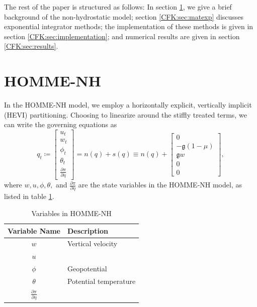 \documentclass{csri19}
\newcommand{\CFKg}{\mathfrak{g}}
\begin{document}
The rest of the paper is structured as follows: In section 
\ref{CFK:sec:homme}, we give a brief background of the non-hydrostatic 
model; section \ref{CFK:sec:matexp} discusses exponential integrator 
methods; the implementation of these methods is given in section 
\ref{CFK:sec:implementation}; and numerical results are given in section 
\ref{CFK:sec:results}.

\section{HOMME-NH}\label{CFK:sec:homme}
In the HOMME-NH model, we employ a horizontally explicit, vertically 
implicit (HEVI) partitioning. Choosing to linearize around the stiffly 
treated terms, we can write the governing equations as
\[q_t \coloneqq \begin{bmatrix} u_t \\
w_t\\
\phi_t\\
\theta_t\\
\frac{\partial \pi}{\partial \eta}
\end{bmatrix} = n(q) + s(q) \equiv n(q) + \begin{bmatrix}
0\\
-\CFKg (1-\mu)\\
\CFKg w\\
0\\
0\end{bmatrix},\] 
where $w, u,\phi, \theta,$ and $\frac{\partial \pi}{\partial \eta}$ are the
 state variables in the HOMME-NH model, as listed in table \ref{CFK:tab:variables}.

\begin{table}
  \caption{Variables in HOMME-NH}
  \label{CFK:tab:variables}
  \begin{center}
    \begin{tabular}{|c|l|}
      \hline
      \textbf{Variable Name} & \textbf{Description} \\
      \hline
      $w$ & Vertical velocity \\
      $u$ & \\
      $\phi$ & Geopotential \\
      $\theta$ & Potential temperature \\
      $\frac{\partial\pi}{\partial\eta}$ & \\
      \hline 
    \end{tabular}
  \end{center}
\end{table}
\end{document}
